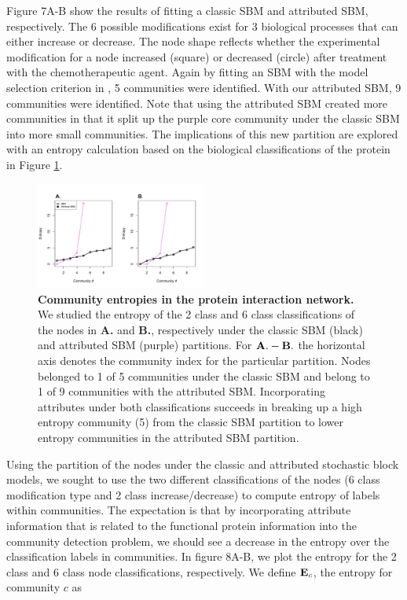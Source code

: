 \documentclass[journal]{IEEEtran}
\begin{document}
Figure 7A-B show the results of fitting a classic SBM and attributed SBM, respectively.  The 6 possible modifications exist for 3 biological processes that can either increase or decrease. The node shape reflects whether the experimental modification for a node increased (square) or decreased (circle) after treatment with the chemotherapeutic agent. Again by fitting an SBM with the model selection criterion in \cite{dudin}, 5 communities were identified. With our attributed SBM, 9 communities were identified. Note that using the attributed SBM created more communities in that it split up the purple core community under the classic SBM into more small communities. The implications of this new partition are explored with an entropy calculation based on the biological classifications of the protein in Figure \ref{entropyFig}.
 \begin{figure}[h!]
\begin{center}
\includegraphics[width=0.5\textwidth]{EntropyCalc_6Classleft_2classright.pdf}
\caption{{\bf Community entropies in the protein interaction network.} We studied the entropy of the 2 class and 6 class classifications of the nodes in {\bf A.} and {\bf B.}, respectively under the classic SBM (black) and attributed SBM (purple) partitions. For ${\bf A.-B.}$ the horizontal axis denotes the community index for the particular partition. Nodes belonged to 1 of 5 communities under the classic SBM and belong to 1 of 9 communities with the attributed SBM. Incorporating attributes under both classifications succeeds in breaking up a high entropy community (5) from the classic SBM partition to lower entropy communities in the attributed SBM partition. }
\label{entropyFig}
\end{center}
\end{figure}

Using the partition of the nodes under the classic and attributed stochastic block models, we sought to use the two different classifications of the nodes (6 class modification type and 2 class increase/decrease) to compute entropy of labels within communities. The expectation is that by incorporating attribute information that is related to the functional protein information into the community detection problem, we should see a decrease in the entropy over the classification labels in communities. In figure 8A-B, we plot the entropy for the 2 class and 6 class node classifications, respectively. We define ${\bf E}_{c}$, the entropy for community $c$ as
\end{document}
